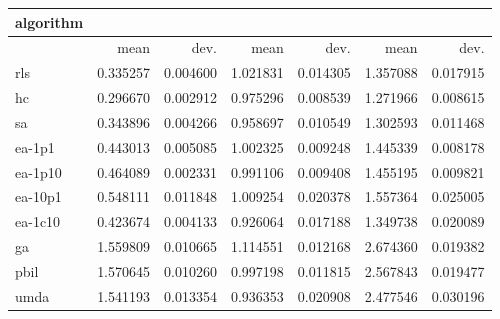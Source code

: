 \begin{tabular}{@{}l*{6}{>{{}}N{1}{2}}@{}}
\toprule
{algorithm} &  &  &  \\
\midrule
& {mean} & {dev.} & {mean} & {dev.} & {mean} & {dev.} \\
\midrule
rls & 0.335257 & 0.004600 & 1.021831 & 0.014305 & 1.357088 & 0.017915 \\
 hc & 0.296670 & 0.002912 & 0.975296 & 0.008539 & 1.271966 & 0.008615 \\
 sa & 0.343896 & 0.004266 & 0.958697 & 0.010549 & 1.302593 & 0.011468 \\
 ea-1p1 & 0.443013 & 0.005085 & 1.002325 & 0.009248 & 1.445339 & 0.008178 \\
 ea-1p10 & 0.464089 & 0.002331 & 0.991106 & 0.009408 & 1.455195 & 0.009821 \\
 ea-10p1 & 0.548111 & 0.011848 & 1.009254 & 0.020378 & 1.557364 & 0.025005 \\
 ea-1c10 & 0.423674 & 0.004133 & 0.926064 & 0.017188 & 1.349738 & 0.020089 \\
 ga & 1.559809 & 0.010665 & 1.114551 & 0.012168 & 2.674360 & 0.019382 \\
 pbil & 1.570645 & 0.010260 & 0.997198 & 0.011815 & 2.567843 & 0.019477 \\
 umda & 1.541193 & 0.013354 & 0.936353 & 0.020908 & 2.477546 & 0.030196 \\
 \bottomrule
\end{tabular}
